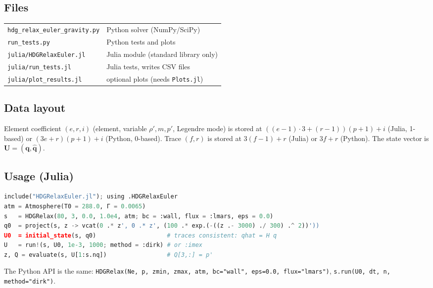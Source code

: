 \documentclass[11pt,a4paper]{article}
\newcommand{\qh}{\hat{\bm q}}
\newcommand{\q}{\bm q}
\begin{document}
\subsection{Files}
\begin{tabular}{ll}
\texttt{hdg\_relax\_euler\_gravity.py} & Python solver (NumPy/SciPy)\\
\texttt{run\_tests.py} & Python tests and plots\\
\texttt{julia/HDGRelaxEuler.jl} & Julia module (standard library only)\\
\texttt{julia/run\_tests.jl} & Julia tests, writes CSV files\\
\texttt{julia/plot\_results.jl} & optional plots (needs \texttt{Plots.jl})\\
\end{tabular}

\subsection{Data layout}
Element coefficient $(e,r,i)$ (element, variable $\rho',m,p'$, Legendre mode) is stored at
$((e-1)\cdot3+(r-1))(p+1)+i$ (Julia, 1-based) or $(3e+r)(p+1)+i$ (Python, 0-based). Trace
$(f,r)$ is stored at $3(f-1)+r$ (Julia) or $3f+r$ (Python). The state vector is $\bm U=(\q,\qh)$.

\subsection{Usage (Julia)}
\begin{lstlisting}[language=Python]
include("HDGRelaxEuler.jl"); using .HDGRelaxEuler
atm = Atmosphere(T0 = 288.0, Γ = 0.0065)
s   = HDGRelax(80, 3, 0.0, 1.0e4, atm; bc = :wall, flux = :lmars, eps = 0.0)
q0  = project(s, z -> vcat(0 .* z', 0 .* z', (100 .* exp.(-((z .- 3000) ./ 300) .^ 2))'))
U0  = initial_state(s, q0)                    # traces consistent: qhat = H q
U   = run!(s, U0, 1e-3, 1000; method = :dirk) # or :imex
z, Q = evaluate(s, U[1:s.nq])                 # Q[3,:] = p'
\end{lstlisting}
The Python API is the same: \texttt{HDGRelax(Ne, p, zmin, zmax, atm, bc="wall", eps=0.0,
flux="lmars")}, \texttt{s.run(U0, dt, n, method="dirk")}.
\end{document}
